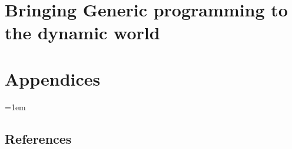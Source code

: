 \documentclass[11pt,a4paper]{book}
\begin{document}


\cleardoublepage


\part{Bringing Generic programming to the dynamic world}
\label{part:dynamic.world}



\cleardoublepage



\cleardoublepage


\part{Appendices}
\label{part:annexes}

\appendix

\emergencystretch=1em

\chapter{References}
\label{chap:bibliography}


\printbibliography[category=cited,heading=bibintoc]


\cleardoublepage




\end{document}
